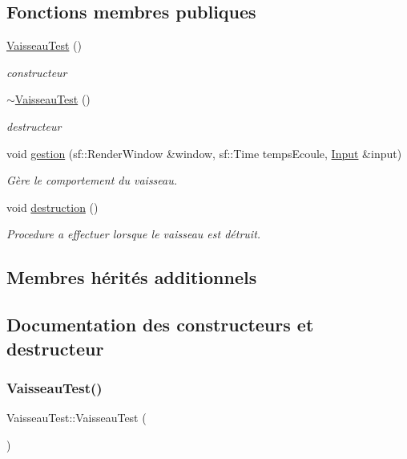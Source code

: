 \subsection*{Fonctions membres publiques}
\begin{DoxyCompactItemize}
\item 
\hyperlink{class_vaisseau_test_acbe01fc8952d9c6fd52cbf311a92c903}{Vaisseau\+Test} ()
\begin{DoxyCompactList}\small\item\em constructeur \end{DoxyCompactList}\item 
\hyperlink{class_vaisseau_test_ada9b5788bc092ecede953248cd6133e8}{$\sim$\+Vaisseau\+Test} ()
\begin{DoxyCompactList}\small\item\em destructeur \end{DoxyCompactList}\item 
void \hyperlink{class_vaisseau_test_a83da402707d73465178b4e654d2e054a}{gestion} (sf\+::\+Render\+Window \&window, sf\+::\+Time temps\+Ecoule, \hyperlink{_input_8h_a5588d60d674991c719a8df848313e966}{Input} \&input)
\begin{DoxyCompactList}\small\item\em Gère le comportement du vaisseau. \end{DoxyCompactList}\item 
void \hyperlink{class_vaisseau_test_a5b8b67886ecb73d8f720f8499ef3c378}{destruction} ()
\begin{DoxyCompactList}\small\item\em Procedure a effectuer lorsque le vaisseau est détruit. \end{DoxyCompactList}\end{DoxyCompactItemize}
\subsection*{Membres hérités additionnels}


\subsection{Documentation des constructeurs et destructeur}
\mbox{\label{class_vaisseau_test_acbe01fc8952d9c6fd52cbf311a92c903}} 
\subsubsection{\texorpdfstring{Vaisseau\+Test()}{VaisseauTest()}}
{\footnotesize\ttfamily Vaisseau\+Test\+::\+Vaisseau\+Test (\begin{DoxyParamCaption}{ }\end{DoxyParamCaption})}



